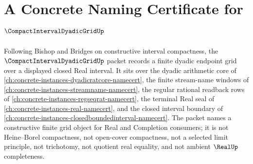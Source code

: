 \chapter{A Concrete Naming Certificate for $\CompactIntervalDyadicGridUp$}
\label{ch:concrete-instances-compact-interval-dyadic-grid-namecert}

Following Bishop and Bridges on constructive interval compactness, the $\CompactIntervalDyadicGridUp$ packet records a finite dyadic endpoint grid over a displayed closed Real interval. It sits over the dyadic arithmetic core of \autoref{ch:concrete-instances-dyadicratcore-namecert}, the finite stream-name windows of \autoref{ch:concrete-instances-streamname-namecert}, the regular rational readback rows of \autoref{ch:concrete-instances-regseqrat-namecert}, the terminal Real seal of \autoref{ch:concrete-instances-real-namecert}, and the closed interval boundary of \autoref{ch:concrete-instances-closedboundedinterval-namecert}. The packet names a constructive finite grid object for Real and Completion consumers; it is not Heine--Borel compactness, not open-cover compactness, not a selected limit principle, not trichotomy, not quotient real equality, and not ambient $\RealUp$ completeness.

